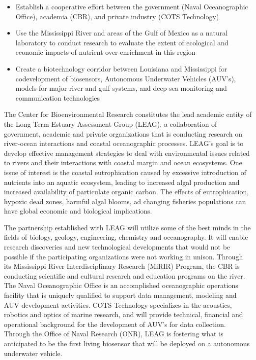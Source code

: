 \begin{itemize}

\item Establish a cooperative effort between the government (Naval Oceanographic Office), 
academia (CBR), and private industry (COTS Technology)
\item Use the Mississippi River and areas of the Gulf of Mexico as a natural laboratory to 
conduct research to evaluate the extent of ecological and economic impacts of nutrient 
over-enrichment in this region
\item Create a biotechnology corridor between Louisiana and
Mississippi for codevelopment of 
biosensors, Autonomous Underwater Vehicles (AUV's), models for major river and gulf 
systems, and deep sea monitoring and communication technologies
\end{itemize}

The Center for Bioenvironmental Research constitutes the lead academic entity of the Long 
Term Estuary Assessment Group (LEAG), a collaboration of government, academic and private 
organizations that is conducting research on river-ocean interactions and coastal oceanographic 
processes. LEAG's goal is to develop effective management strategies to deal with 
environmental issues related to rivers and their interactions with coastal margin and ocean 
ecosystems.  One issue of interest is the coastal eutrophication caused by excessive introduction 
of nutrients into an aquatic ecosystem, leading to increased algal production and increased 
availability of particulate organic carbon. The effects of eutrophication, hypoxic dead zones, 
harmful algal blooms, ad changing fisheries populations can have global economic and 
biological implications.

The partnership established with LEAG will utilize some of the best minds in the fields of 
biology, geology, engineering, chemistry and oceanography. It will enable research discoveries 
and new technological developments that would not be possible if the participating organizations 
were not working in unison. Through its Mississippi River Interdisciplinary Research (MiRIR) 
Program, the CBR is conducting scientific and cultural research and education programs on the 
river. The Naval Oceanographic Office is an accomplished oceanographic operations facility that 
is uniquely qualified to support data management, modeling and AUV development activities. 
COTS Technology specializes in the acoustics, robotics and optics of marine research, and will 
provide technical, financial and operational background for the development of AUV's for data 
collection.  Through the Office of Naval Research (ONR), LEAG is fostering what is anticipated 
to be the first living biosensor that will be deployed on a autonomous underwater vehicle.


